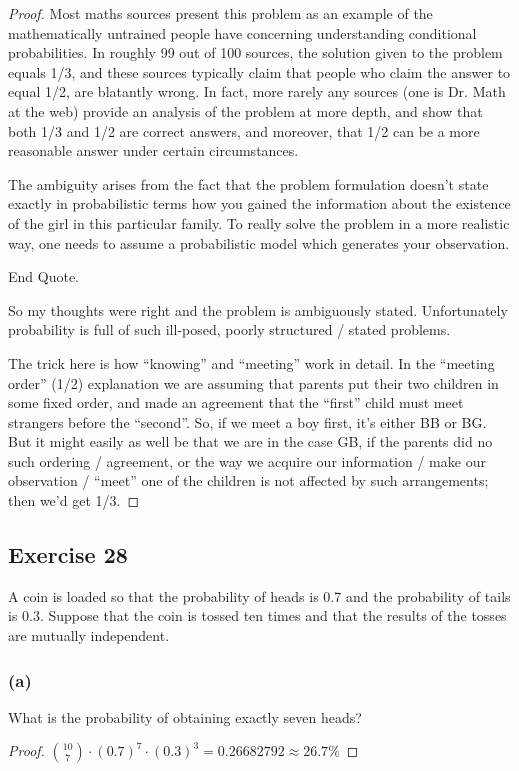 \documentclass[14pt]{extarticle}
\begin{document}
\begin{proof}
     Most maths sources present this problem as an example of the mathematically untrained people have concerning understanding
     conditional probabilities. In roughly 99 out of 100 sources, the solution given to the problem equals 1/3, and these
     sources typically claim that people who claim the answer to equal 1/2, are blatantly wrong. In fact, more rarely any
     sources (one is Dr. Math at the web) provide an analysis of the problem at more depth, and show that both 1/3 and 1/2 are
     correct answers, and moreover, that 1/2 can be a more reasonable answer under certain circumstances.

     The ambiguity arises from the fact that the problem formulation doesn’t state exactly in probabilistic terms how
     you gained the information about the existence of the girl in this particular family. To really solve the problem in a more
     realistic way, one needs to assume a probabilistic model which generates your observation.

     End Quote.

     So my thoughts were right and the problem is ambiguously stated. Unfortunately probability is full of such ill-posed,
     poorly structured / stated problems.

     The trick here is how ``knowing'' and ``meeting'' work in detail. In the ``meeting order'' (1/2) explanation we are
     assuming that parents put their two children in some fixed order, and made an agreement that the ``first'' child must
     meet strangers before the ``second''. So, if we meet a boy first, it's either BB or BG. But it might easily as well be
     that we are in the case GB, if the parents did no such ordering / agreement, or the way we acquire our information /
     make our observation / ``meet'' one of the children is not affected by such arrangements; then we'd get 1/3.
\end{proof}

\subsection{Exercise 28}
A coin is loaded so that the probability of heads is 0.7 and the probability of tails is 0.3. Suppose that the coin is
tossed ten times and that the results of the tosses are mutually independent.

\subsubsection{(a)}
What is the probability of obtaining exactly seven heads?
\begin{proof}
     \(\binom{10}{7} \cdot (0.7)^7 \cdot (0.3)^3 = 0.26682792 \approx 26.7\%\)
\end{proof}
\end{document}
